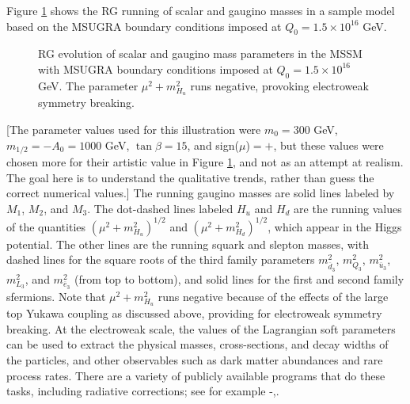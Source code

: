 \documentclass[11pt]{article}
\def\sbar{\overline}
\begin{document}
Figure \ref{fig:running} shows the RG running of scalar and gaugino 
masses in a sample model based on the MSUGRA boundary 
conditions imposed at $Q_0 = 1.5\times 10^{16}$ GeV.
\begin{figure} 
\vspace{-0.2cm}
\centerline{} 
\vspace{-0.24cm}
\caption{RG evolution of scalar and gaugino mass parameters 
in the MSSM with MSUGRA boundary conditions imposed at $Q_0 = 1.5\times 
10^{16}$ GeV. The parameter 
$\mu^2 + m^2_{H_u}$ runs negative, provoking electroweak
symmetry breaking. 
\label{fig:running}}
\end{figure} 
[The parameter values used for this illustration were $m_0 = 300$ GeV, 
$m_{1/2} = -A_0 = 1000$ GeV, $\tan\beta = 15$, and 
sign($\mu$)$=+$, but these values were chosen more for their
artistic value in Figure \ref{fig:running}, and not as an attempt at realism.
The goal here is to understand the qualitative trends, 
rather than guess the correct numerical values.] 
The running gaugino masses are solid lines labeled by 
$M_1$, $M_2$, and $M_3$. The dot-dashed lines labeled $H_u$ and $H_d$ are 
the running values of the quantities $(\mu^2 + m_{H_u}^2)^{1/2}$ and 
$({\mu^2 + m_{H_d}^2})^{1/2}$, which appear in the Higgs potential. The 
other lines are the running squark and slepton masses, with dashed lines 
for the square roots of the third family parameters $m^2_{\sbar d_3}$, 
$m^2_{Q_3}$, $m^2_{\sbar u_3}$, $m^2_{L_3}$, and $m^2_{\sbar e_3}$ (from 
top to bottom), and solid lines for the first and second family sfermions. 
Note that $\mu^2 + m_{H_u}^2$ runs negative because of the effects of the 
large top Yukawa coupling as discussed above, providing for electroweak 
symmetry breaking. At the electroweak scale, the values of the Lagrangian 
soft parameters can be used to extract the physical masses, 
cross-sections, and decay widths of the particles, and other observables 
such as dark matter abundances and rare process rates. There are a variety 
of publicly available programs that do these tasks, including radiative 
corrections; see for example
\cite{ISAJET}-\cite{micrOMEGAs},\cite{FeynHiggs}.
\end{document}
